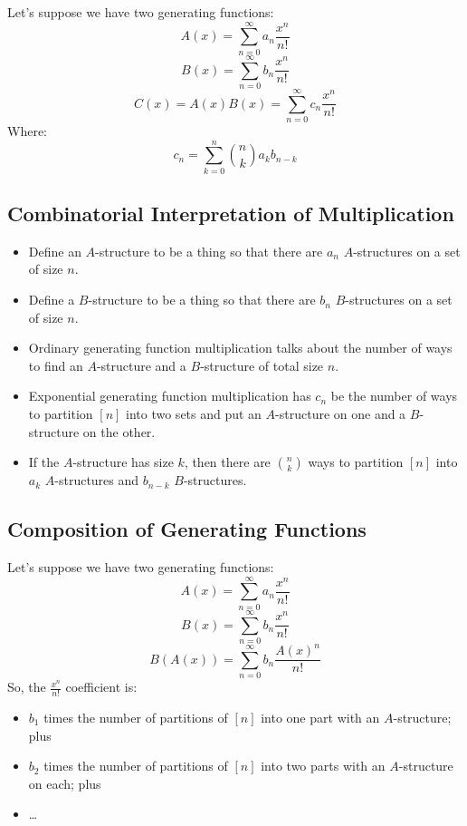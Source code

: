 \documentclass[letterpaper]{article}
\begin{document}
\bigskip 

Let's suppose we have two generating functions:
\[A(x) = \sum_{n = 0}^{\infty} a_n \frac{x^n}{n!}\]
\[B(x) = \sum_{n = 0}^{\infty} b_n \frac{x^n}{n!}\]
\[C(x) = A(x)B(x) = \sum_{n = 0}^{\infty} c_n \frac{x^n}{n!}\]
Where:
\[c_n = \sum_{k = 0}^{n} \binom{n}{k} a_k b_{n - k}\]

\subsection{Combinatorial Interpretation of Multiplication}
\begin{itemize}
    \item Define an $A$-structure to be a thing so that there are $a_n$ $A$-structures on a set of size $n$. 
    \item Define a $B$-structure to be a thing so that there are $b_n$ $B$-structures on a set of size $n$. 
    \item Ordinary generating function multiplication talks about the number of ways to find an $A$-structure and a $B$-structure of total size $n$. 
    \item Exponential generating function multiplication has $c_n$ be the number of ways to partition $[n]$ into two sets and put an $A$-structure on one and a $B$-structure on the other. 
    \item If the $A$-structure has size $k$, then there are $\binom{n}{k}$ ways to partition $[n]$ into $a_k$ $A$-structures and $b_{n - k}$ $B$-structures.
\end{itemize}

\subsection{Composition of Generating Functions}
Let's suppose we have two generating functions:
\[A(x) = \sum_{n = 0}^{\infty} a_n \frac{x^n}{n!}\]
\[B(x) = \sum_{n = 0}^{\infty} b_n \frac{x^n}{n!}\]
\[B(A(x)) = \sum_{n = 0}^{\infty} b_n \frac{A(x)^n}{n!}\]
So, the $\frac{x^n}{n!}$ coefficient is:
\begin{itemize}
    \item $b_1$ times the number of partitions of $[n]$ into one part with an $A$-structure; plus
    \item $b_2$ times the number of partitions of $[n]$ into two parts with an $A$-structure on each; plus 
    \item \dots 
\end{itemize}
\end{document}
